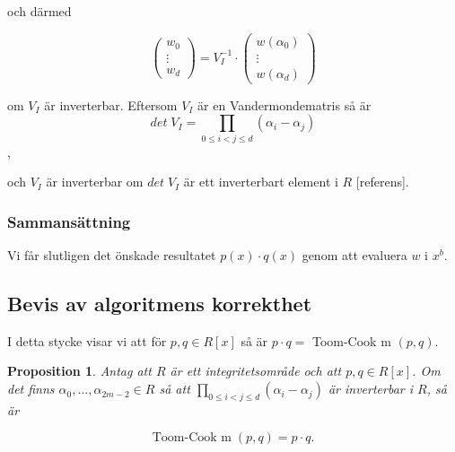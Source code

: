 \documentclass[a4paper]{article}
\newtheorem{proposition}[theorem]{Proposition}
\begin{document}
och därmed

\begin{equation}
\label{eq:NAME5}
\begin{pmatrix}
  w_0\\
  \vdots\\
  w_d
\end{pmatrix} =
V_I^{-1} \cdot
\begin{pmatrix}
  w(\alpha_0)\\
  \vdots\\
  w(\alpha_d)
\end{pmatrix}
\end{equation}

om $V_I$ är inverterbar. Eftersom $V_I$ är en Vandermondematris så är
\begin{equation}
 \label{eq:NAME6}
det \; V_I = \prod_{0 \leq i < j \leq d} (\alpha_i - \alpha_j)
\end{equation},

och $V_I$ är inverterbar om $det \; V_I$ är ett inverterbart element i $R$ [referens].

\subsubsection{Sammansättning}
Vi får slutligen det önskade resultatet $p(x) \cdot q(x)$ genom att evaluera $w$ i $x^b$.

\subsection{Bevis av algoritmens korrekthet}
I detta stycke visar vi att för $p, q \in R[x]$ så är $p \cdot q =$ Toom-Cook m $(p, q)$.

\begin{proposition}
 Antag att $R$ är ett integritetsområde och att $p, q \in R[x]$. Om det finns
$\alpha_0, ...,  \alpha_{2m-2} \in R$ så att $ \prod_{0 \leq i < j \leq d} (\alpha_i - \alpha_j)$
är inverterbar i $R$, så är

\begin{equation}
  \label{eq:name7}
  \text{Toom-Cook m} \; (p, q) =  p \cdot q.
\end{equation}

\end{proposition}
\end{document}
